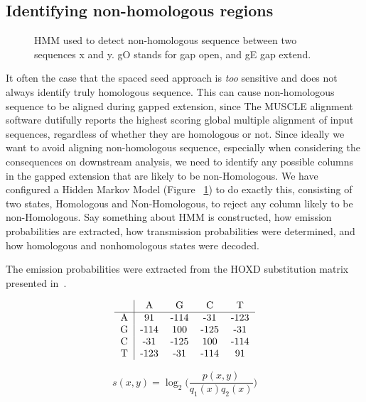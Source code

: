 \documentclass{ws-procs9x6}
\begin{document}
\subsection{Identifying non-homologous regions}
\begin{figure}[t]
\centering {}
\caption{HMM used to detect non-homologous sequence between two sequences x and y. gO stands for gap open, and gE gap extend. }

\label{fig-hmm}\vspace{-0.2cm}
\end{figure}

It often the case that the spaced seed approach is \emph{too} sensitive and does not always identify truly homologous sequence. This can cause non-homologous sequence to be aligned during gapped extension, since The MUSCLE alignment software dutifully reports the highest scoring global multiple alignment of input sequences, regardless of whether they are homologous or not. Since ideally we want to avoid aligning non-homologous sequence, especially when considering the consequences on downstream analysis, we need to identify any possible columns in the gapped extension that are likely to be non-Homologous. We have configured a Hidden Markov Model (Figure ~\ref{fig-hmm}) to do exactly this, consisting of two states, Homologous and Non-Homologous, to reject any column likely to be non-Homologous. Say something about HMM is constructed, how emission probabilities are extracted, how transmission probabilities were determined, and how homologous and nonhomologous states were decoded.

The emission probabilities were extracted from the HOXD substitution matrix presented in~\cite{hoxd}.

\begin{equation}
\begin{tabular}
{c|cccc}
& A & G & C & T \\
\hline
 A   & 91 & -114 &-31 & -123 \\
 G   & -114 & 100 &-125 & -31 \\
 C   & -31 & -125 &100 & -114\\
 T   & -123 & -31 &-114 & 91 \\
\end{tabular}
\end{equation}

\begin{equation}
s(x,y)= \log_{2}{\Bigg(\frac{p(x,y)}{q_{1}(x)q_{2}(x)}\Bigg)}
\end{equation}
\end{document}

